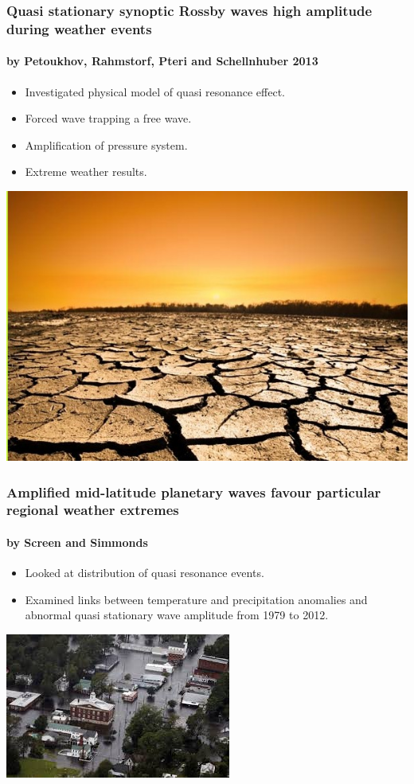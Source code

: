 \documentclass{beamer}
\begin{document}
 \begin{frame}
 \frametitle{Quasi stationary synoptic Rossby waves high amplitude during weather events }
\framesubtitle{by Petoukhov, Rahmstorf, Pteri and Schellnhuber 2013}
\begin{itemize}
	\item Investigated physical model of quasi resonance effect.
	\item Forced wave trapping a free wave.
	\item Amplification of pressure system.
	\item Extreme weather results.
\end{itemize}
\centering\includegraphics[height=0.4\textheight]{drought}

\end{frame}
\begin{frame}
\frametitle{Amplified mid-latitude planetary waves favour particular regional weather extremes}
\framesubtitle{ 
	by Screen and Simmonds }
\begin{itemize}
	\item Looked at distribution of quasi resonance events.
	\item Examined links between temperature and precipitation anomalies and abnormal quasi stationary wave amplitude from 1979 to 2012.
	
\end{itemize}
\centering\includegraphics[height=0.4\textheight]{flood}
\end{frame}
\end{document}
